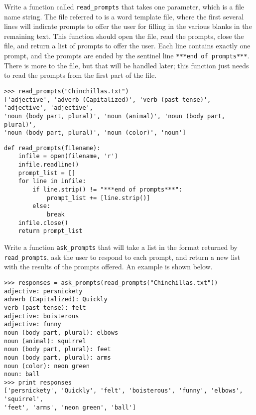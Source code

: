 \documentclass[10pt,answers]{exam}
\begin{document}
\begin{questions}

\question Write a function called \lstinline{read_prompts} that takes one parameter, which is a file name string.  The file referred to 
is a word template file, where the first several lines will indicate prompts to offer the user for filling in the various blanks in the 
remaining text.  This function should open the file, read the prompts, close the file, and return a list of prompts to offer the user.  
Each line contains exactly one prompt, and the prompts are ended by the sentinel line \lstinline{***end of prompts***}.  There is more 
to the file, but that will be handled later; this function just needs to read the prompts from the first part of the file.

\begin{lstlisting}
>>> read_prompts("Chinchillas.txt")
['adjective', 'adverb (Capitalized)', 'verb (past tense)', 'adjective', 'adjective', 
'noun (body part, plural)', 'noun (animal)', 'noun (body part, plural)', 
'noun (body part, plural)', 'noun (color)', 'noun']
\end{lstlisting}

\begin{solution}
\begin{lstlisting}
def read_prompts(filename):
    infile = open(filename, 'r')
    infile.readline()
    prompt_list = []
    for line in infile:
        if line.strip() != "***end of prompts***":
            prompt_list += [line.strip()]
        else:
            break
    infile.close()
    return prompt_list
\end{lstlisting}
\end{solution}

\question Write a function \lstinline{ask_prompts} that will take a list in the format returned by 
\lstinline{read_prompts}, ask the user to respond to each prompt, and return a new list with the 
results of the prompts offered.  An example is shown below.

\begin{lstlisting}
>>> responses = ask_prompts(read_prompts("Chinchillas.txt"))
adjective: persnickety
adverb (Capitalized): Quickly
verb (past tense): felt
adjective: boisterous
adjective: funny
noun (body part, plural): elbows
noun (animal): squirrel
noun (body part, plural): feet
noun (body part, plural): arms
noun (color): neon green
noun: ball
>>> print responses
['persnickety', 'Quickly', 'felt', 'boisterous', 'funny', 'elbows', 'squirrel', 
'feet', 'arms', 'neon green', 'ball']
\end{lstlisting}


\end{questions}
\end{document}
